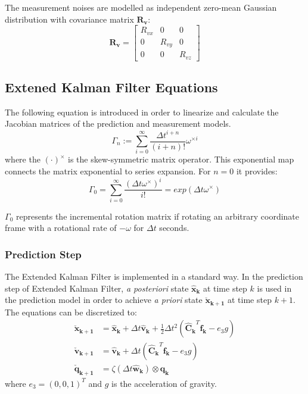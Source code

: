 \documentclass[letterpaper, 10 pt, conference]{ieeeconf}  %
\begin{document}
The measurement noises are modelled as independent zero-mean Gaussian distribution with covariance matrix $\bm{R_v}$:
\begin{equation}
\renewcommand\arraystretch{1.2}
\bm{R_v} = \begin{bmatrix}
R_{vx}  & 0   & 0 \\
0  & R_{vy}   & 0 \\
0  & 0   & R_{vz} 
\end{bmatrix}
\end{equation}

\subsection{Extened Kalman Filter Equations}
The following equation is introduced in order to linearize and calculate the Jacobian matrices of the prediction and measurement models. 
\begin{equation}
\Gamma_n:=\sum_{i=0}^{\infty}\frac{\Delta t^{i+n}}{\left(i+n\right)!}\omega^{\times i}
\end{equation}
where the $\left(\cdot\right)^{\times}$ is the skew-symmetric matrix operator. This exponential map connects the matrix exponential to series expansion. For $n=0$ it provides:
\begin{equation}
\Gamma_0=\sum_{i=0}^{\infty}\frac{\left(\Delta t\omega^{\times}\right)^i}{i!}=exp(\Delta t\omega^{\times})
\end{equation}

$\Gamma_0$ represents the incremental rotation matrix if rotating an arbitrary coordinate frame with a rotational rate of $-\omega$ for $\Delta t$ seconds.
\subsubsection{Prediction Step}
The Extended Kalman Filter is implemented in a standard way. 
In the prediction step of Extended Kalman Filter, \textit{a posteriori} state  $\bm{\hat{x}_k}$ at time step $k$ is used in the prediction model in order to achieve \textit{a priori} state $\bm{\check{x}_{k+1}}$ at time step $k+1$. The equations can be discretized to:
\begin{equation}
\begin{split}
\bm{\check{x}_{k+1}} &= \bm{\hat{x}_{k}+}\Delta t\bm{\hat{v}_{k}}+\frac{1}{2}\Delta t^2\left(\bm{\hat{C}_{k}}^T \bm{f_k}-e_3g\right) \\
\bm{\check{v}_{k+1}}  &= \bm{\hat{v}_k}+\Delta t\left(\bm{\hat{C}_k}^T \bm{f_k}-e_3 g\right) \\
\bm{\check{q}_{k+1}} &= \zeta\left(\Delta t \bm{\hat{w}_k}\right)\otimes \bm{\hat{q}_{k}}
\end{split}
\end{equation}
where $e_3=(0,0,1)^T$ and $g$ is the acceleration of gravity.
 
\end{document}
